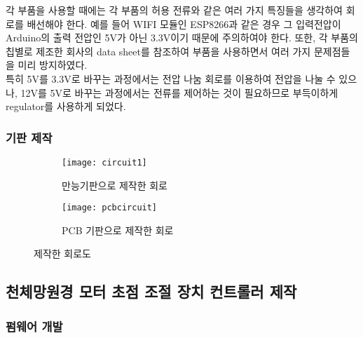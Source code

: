 각 부품을 사용할 때에는 각 부품의 허용 전류와 같은 여러 가지 특징들을 생각하여 회로를 배선해야 한다. 예를 들어 WIFI 모듈인 ESP8266과 같은 경우 그 입력전압이 Arduino의 출력 전압인 5V가 아닌 3.3V이기 때문에 주의하여야 한다. 또한, 각 부품의 칩별로 제조한 회사의 data sheet를 참조하여 부품을 사용하면서 여러 가지 문제점들을 미리 방지하였다.\\
특히 5V를 3.3V로 바꾸는 과정에서는 전압 나눔 회로를 이용하여 전압을 나눌 수 있으나, 12V를 5V로 바꾸는 과정에서는 전류를 제어하는 것이 필요하므로 부득이하게 regulator를 사용하게 되었다.

\subsubsection{기판 제작}

\begin{figure}[h]
	\begin{subfigure}{0.5\textwidth}
		\texttt{[image: circuit1]} 
		\caption{만능기판으로 제작한 회로}
		\label{fig:circuit1}
	\end{subfigure}
	\begin{subfigure}{0.5\textwidth}
		\texttt{[image: pcbcircuit]}
		\caption{PCB 기판으로 제작한 회로}
		\label{fig:pcbcircuit}
	\end{subfigure}
	\caption{제작한 회로도}
	\label{fig:image2}
\end{figure}



\subsection{천체망원경 모터 초점 조절 장치 컨트롤러 제작}

\subsubsection{펌웨어 개발}


